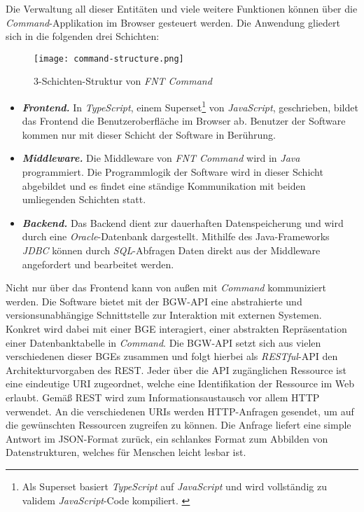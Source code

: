 Die Verwaltung all dieser Entitäten und viele weitere Funktionen können über die \textit{Command}-Applikation im Browser gesteuert werden. Die Anwendung gliedert sich in die folgenden drei Schichten:

\begin{figure}[h]
    \centering
    \texttt{[image: command-structure.png]}
    \caption{3-Schichten-Struktur von \textit{FNT Command}}
\end{figure}

\begin{itemize}
    \item \textit{\textbf{Frontend.}} In \textit{TypeScript}, einem Superset\footnote{Als Superset basiert \textit{TypeScript} auf \textit{JavaScript} und wird vollständig zu validem \textit{JavaScript}-Code kompiliert. \cite{ts:2021}} von \textit{JavaScript}, geschrieben, bildet das Frontend die Benutzeroberfläche im Browser ab. Benutzer der Software kommen nur mit dieser Schicht der Software in Berührung.
    \item \textit{\textbf{Middleware.}} Die Middleware von \textit{FNT Command} wird in \textit{Java} programmiert. Die Programmlogik der Software wird in dieser Schicht abgebildet und es findet eine ständige Kommunikation mit beiden umliegenden Schichten statt.
    \item \textit{\textbf{Backend.}} Das Backend dient zur dauerhaften Datenspeicherung und wird durch eine \textit{Oracle}-Datenbank dargestellt. Mithilfe des Java-Frameworks \textit{JDBC} können durch \textit{\ac{SQL}}-Abfragen Daten direkt aus der Middleware angefordert und bearbeitet werden.
\end{itemize}

\newpage
Nicht nur über das Frontend kann von außen mit \textit{Command} kommuniziert werden. Die Software bietet mit der \ac{BGW}-\ac{API} eine abstrahierte und versionsunabhängige Schnittstelle zur Interaktion mit externen Systemen. Konkret wird dabei mit einer \ac{BGE} interagiert, einer abstrakten Repräsentation einer Datenbanktabelle in \textit{Command}. Die \ac{BGW}-\ac{API} setzt sich aus vielen verschiedenen dieser \ac{BGE}s zusammen und folgt hierbei als \textit{RESTful}-\ac{API} den Architekturvorgaben des \ac{REST}. Jeder über die \ac{API} zugänglichen Ressource ist eine eindeutige \ac{URI} zugeordnet, welche eine Identifikation der Ressource im Web erlaubt. \cite{berners:2005} Gemäß \ac{REST} wird zum Informationsaustausch vor allem \ac{HTTP} verwendet. An die verschiedenen \ac{URI}s werden \ac{HTTP}-Anfragen gesendet, um auf die gewünschten Ressourcen zugreifen zu können. \cite{kalin:2013} Die Anfrage liefert eine simple Antwort im \ac{JSON}-Format zurück, ein schlankes Format zum Abbilden von Datenstrukturen, welches für Menschen leicht lesbar ist. \cite[S. 266.]{richardson:2008} 

